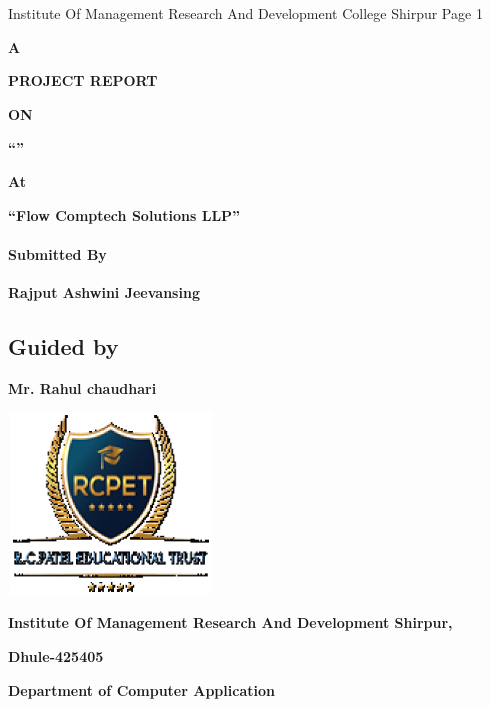 \documentclass{article} %
\begin{document}


\noindent 

\noindent 

\noindent Institute Of Management Research And Development College Shirpur                                         Page {\textbar} 1

\noindent 

\noindent \textbf{                            }

\noindent \textbf{A}

\noindent \textbf{PROJECT REPORT}

\noindent \textbf{ON}

\noindent \textbf{     ``}\textbf{''}

\noindent \textbf{    At}

\noindent \textbf{         ``Flow Comptech Solutions LLP''}

\noindent 
\paragraph{Submitted By}

\noindent \textbf{Rajput Ashwini Jeevansing}

\noindent 
\subsection{                                                    Guided by}

\noindent \textbf{ Mr. Rahul chaudhari}

\noindent \includegraphics*[width=2.15in, height=1.90in, keepaspectratio=false, trim=0.00in 0.02in 0.04in 0.00in]{image1}

\noindent \textbf{Institute Of Management Research And Development Shirpur, }

\noindent \textbf{Dhule-425405}

\noindent \textbf{Department of Computer Application }
\end{document}
